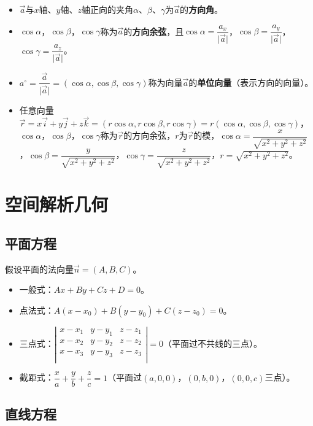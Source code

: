 \documentclass[UTF8, 12pt]{ctexart}
\begin{document}
\begin{itemize}
    \item $\vec{a}$与$x$轴、$y$轴、$z$轴正向的夹角$\alpha$、$\beta$、$\gamma$为$\vec{a}$的\textbf{方向角}。
    \item $\cos\alpha$，$\cos\beta$，$\cos\gamma$称为$\vec{a}$的\textbf{方向余弦}，且$\cos\alpha=\dfrac{a_x}{\vert\vec{a}\vert}$，$\cos\beta=\dfrac{a_y}{\vert\vec{a}\vert}$，$\cos\gamma=\dfrac{a_z}{\vert\vec{a}\vert}$。
    \item $a^\circ=\dfrac{\vec{a}}{\vert\vec{a}\vert}=(\cos\alpha,\cos\beta,\cos\gamma)$称为向量$\vec{a}$的\textbf{单位向量}（表示方向的向量）。
    \item 任意向量$\vec{r}=x\vec{i}+y\vec{j}+z\vec{k}=(r\cos\alpha,r\cos\beta,r\cos\gamma)=r(\cos\alpha,\cos\beta,\cos\gamma)$，$\cos\alpha$，$\cos\beta$，$\cos\gamma$称为$\vec{r}$的方向余弦，$r$为$\vec{r}$的模，$\cos\alpha=\dfrac{x}{\sqrt{x^2+y^2+z^2}}$，$\cos\beta=\dfrac{y}{\sqrt{x^2+y^2+z^2}}$，$\cos\gamma=\dfrac{z}{\sqrt{x^2+y^2+z^2}}$，$r=\sqrt{x^2+y^2+z^2}$。
\end{itemize}

\section{空间解析几何}

\subsection{平面方程}

假设平面的法向量$\vec{n}=(A,B,C)$。

\begin{itemize}
    \item 一般式：$Ax+By+Cz+D=0$。
    \item 点法式：$A(x-x_0)+B(y-y_0)+C(z-z_0)=0$。
    \item 三点式：$\left\vert\begin{array}{ccc}
        x-x_1 & y-y_1 & z-z_1 \\
        x-x_2 & y-y_2 & z-z_2 \\
        x-x_3 & y-y_3 & z-z_3 \\
    \end{array}\right\vert=0$（平面过不共线的三点）。
    \item 截距式：$\dfrac{x}{a}+\dfrac{y}{b}+\dfrac{z}{c}=1$（平面过$(a,0,0)$，$(0,b,0)$，$(0,0,c)$三点）。
\end{itemize}

\subsection{直线方程}
\end{document}
